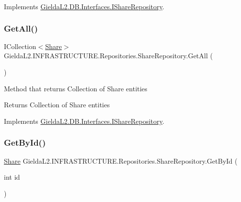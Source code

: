 Implements \mbox{\hyperlink{interface_gielda_l2_1_1_d_b_1_1_interfaces_1_1_i_share_repository_a68449340553ab4702be8f3559ea50131}{Gielda\+L2.\+D\+B.\+Interfaces.\+I\+Share\+Repository}}.

\mbox{\label{class_gielda_l2_1_1_i_n_f_r_a_s_t_r_u_c_t_u_r_e_1_1_repositories_1_1_share_repository_aef8271595f290092d8b99d4789c8f37c}} 
\subsubsection{\texorpdfstring{GetAll()}{GetAll()}}
{\footnotesize\ttfamily I\+Collection$<$\mbox{\hyperlink{class_gielda_l2_1_1_d_b_1_1_entities_1_1_share}{Share}}$>$ Gielda\+L2.\+I\+N\+F\+R\+A\+S\+T\+R\+U\+C\+T\+U\+R\+E.\+Repositories.\+Share\+Repository.\+Get\+All (\begin{DoxyParamCaption}{ }\end{DoxyParamCaption})}



Method that returns Collection of Share entities 

\begin{DoxyReturn}{Returns}
Collection of Share entities
\end{DoxyReturn}


Implements \mbox{\hyperlink{interface_gielda_l2_1_1_d_b_1_1_interfaces_1_1_i_share_repository_a5e13f8b06cb4711bb54137dabf783ed1}{Gielda\+L2.\+D\+B.\+Interfaces.\+I\+Share\+Repository}}.

\mbox{\label{class_gielda_l2_1_1_i_n_f_r_a_s_t_r_u_c_t_u_r_e_1_1_repositories_1_1_share_repository_ac034dd25c3630f8641baf9e7eafe94db}} 
\subsubsection{\texorpdfstring{GetById()}{GetById()}}
{\footnotesize\ttfamily \mbox{\hyperlink{class_gielda_l2_1_1_d_b_1_1_entities_1_1_share}{Share}} Gielda\+L2.\+I\+N\+F\+R\+A\+S\+T\+R\+U\+C\+T\+U\+R\+E.\+Repositories.\+Share\+Repository.\+Get\+By\+Id (\begin{DoxyParamCaption}\item[{int}]{id }\end{DoxyParamCaption})}



